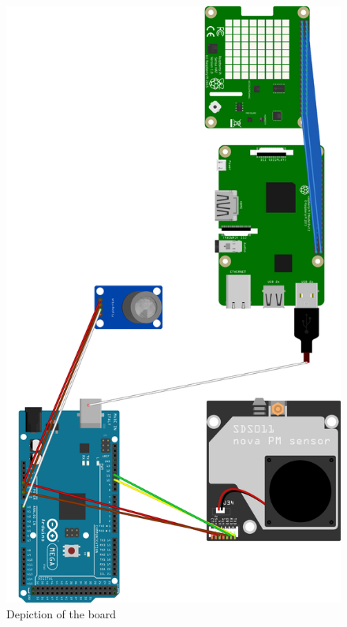\documentclass[12pt, a4paper]{article}
\begin{document}
	\begin{figure}[H]
	\centering
	\includegraphics[height=0.95\textheight]{board.png}
	\caption{Depiction of the board}
	\label{fig:board}
\end{figure}
\clearpage
\end{document}
